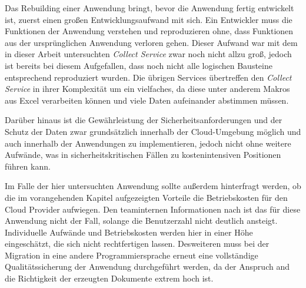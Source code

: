 Das Rebuilding einer Anwendung bringt, bevor die Anwendung fertig entwickelt ist, zuerst einen großen Entwicklungsaufwand mit sich. Ein Entwickler muss die Funktionen der Anwendung verstehen und reproduzieren ohne, dass Funktionen aus der ursprünglichen Anwendung verloren gehen. Dieser Aufwand war mit dem in dieser Arbeit untersuchten \textit{Collect Service} zwar noch nicht allzu groß, jedoch ist bereits bei diesem Aufgefallen, dass noch nicht alle logischen Bausteine entsprechend reproduziert wurden. Die übrigen Services übertreffen den \textit{Collect Service} in ihrer Komplexität um ein vielfaches, da diese unter anderem Makros aus Excel verarbeiten können und viele Daten aufeinander abstimmen müssen.

Darüber hinaus ist die Gewährleistung der Sicherheitsanforderungen und der Schutz der Daten zwar grundsätzlich innerhalb der Cloud-Umgebung möglich und auch innerhalb der Anwendungen zu implementieren, jedoch nicht ohne weitere Aufwände, was in sicherheitskritischen Fällen zu kostenintensiven Positionen führen kann. 

Im Falle der hier untersuchten Anwendung sollte außerdem hinterfragt werden, ob die im vorangehenden Kapitel aufgezeigten Vorteile die Betriebskosten für den Cloud Provider aufwiegen. Den teaminternen Informationen nach ist das für diese Anwendung nicht der Fall, solange die Benutzerzahl nicht deutlich ansteigt. Individuelle Aufwände und Betriebskosten werden hier in einer Höhe eingeschätzt, die sich nicht rechtfertigen lassen. Desweiteren muss bei der Migration in eine andere Programmiersprache erneut eine vollständige Qualitätssicherung der Anwendung durchgeführt werden, da der Anspruch and die Richtigkeit der erzeugten Dokumente extrem hoch ist.
\pagebreak